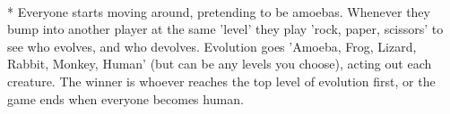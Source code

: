 \begin{minipage}{\textwidth}
\\*
Everyone starts moving around, pretending to be amoebas.  Whenever they bump into another player at the same 'level' they play 'rock, paper, scissors' to see who evolves, and who devolves.  Evolution goes 'Amoeba, Frog, Lizard, Rabbit, Monkey, Human' (but can be any levels you choose), acting out each creature.  The winner is whoever reaches the top level of evolution first, or the game ends when everyone becomes human.
\end{minipage}    \vfill
